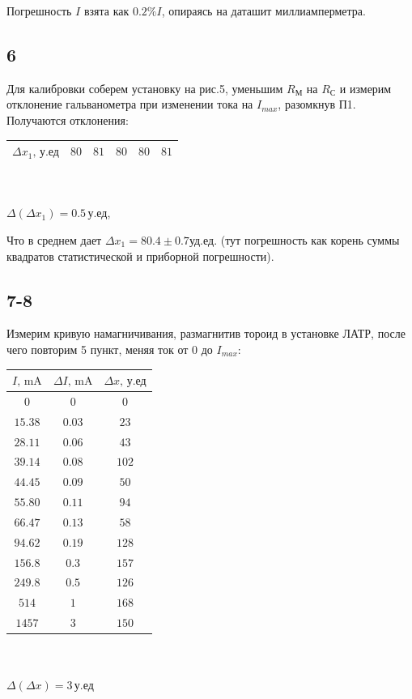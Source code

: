 Погрешность $I$ взята как $0.2\%I$, опираясь на даташит миллиамперметра.


\subsection*{6}
Для калибровки соберем установку на рис.5, уменьшим $R_\text{М}$ на $R_\text{С}$ и измерим отклонение гальванометра при изменении тока на $I_{max}$, разомкнув П1.
Получаются отклонения:
\begin{center}
\begin{tabular}{|c|c|c|c|c|c|}\hline
$\Delta x_1,\,\text{у.ед}$&$80$&$81$&$80$&$80$&$81$\\\hline
\end{tabular}\\~\\
$\Delta (\Delta x_1) = 0.5\,\text{у.ед}$,
\end{center}
Что в среднем дает $\Delta x_1=80.4\pm0.7\text{уд.ед.}$ (тут погрешность как корень суммы квадратов статистической и приборной погрешности).

\newpage
\subsection*{7-8}
Измерим кривую намагничивания, размагнитив тороид в установке ЛАТР, после чего повторим 5 пункт, меняя ток от $0$ до $I_{max}$:

\begin{center}
\begin{tabular}{|c|c|c|}\hline
$I\text{, mA}$&$\Delta I\text{, mA}$&$\Delta x\text{, у.ед}$\\\hline
$0$&$0$&$0$\\\hline
$15.38$&$0.03$&$23$\\\hline
$28.11$&$0.06$&$43$\\\hline
$39.14$&$0.08$&$102$\\\hline
$44.45$&$0.09$&$50$\\\hline
$55.80$&$0.11$&$94$\\\hline
$66.47$&$0.13$&$58$\\\hline
$94.62$&$0.19$&$128$\\\hline
$156.8$&$0.3$&$157$\\\hline
$249.8$&$0.5$&$126$\\\hline
$514$&$1$&$168$\\\hline
$1457$&$3$&$150$\\\hline
\end{tabular}\\~\\
$\Delta (\Delta x)=3\,\text{у.ед}$
\end{center}

